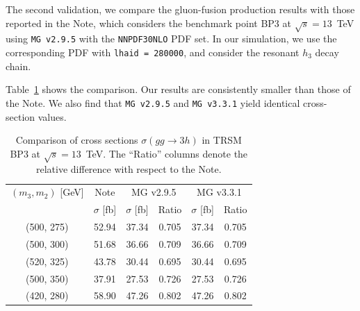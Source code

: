 \documentclass[12pt]{article}
\begin{document}
        The second validation, we compare the gluon-fusion production results with those reported in the Note, which considers the benchmark point BP3 at $\sqrt{s} = 13$~TeV using \verb|MG v2.9.5| with the \texttt{NNPDF30NLO} PDF set. In our simulation, we use the corresponding PDF with \texttt{lhaid = 280000}, and consider the resonant $h_3$ decay chain.  

        Table~\ref{tab:trsm_xs_comparison_13tev} shows the comparison. Our results are consistently smaller than those of the Note. We also find that \verb|MG v2.9.5| and \verb|MG v3.3.1| yield identical cross-section values.  
        \begin{table}[htpb]
            \centering
            \caption{Comparison of cross sections $\sigma(gg \to 3h)$ in TRSM BP3 at $\sqrt{s} = 13$~TeV. The ``Ratio'' columns denote the relative difference with respect to the Note.}
            \label{tab:trsm_xs_comparison_13tev}
            \begin{tabular}{c|c|cc|cc}
                $(m_3, m_2)$ [GeV] & Note & \multicolumn{2}{c|}{MG v2.9.5} & \multicolumn{2}{c}{MG v3.3.1} \\ \cline{2-6} 
                                   & $\sigma$ [fb] & $\sigma$ [fb] & Ratio & $\sigma$ [fb] & Ratio \\ \hline
                (500, 275) & 52.94 & 37.34 & 0.705 & 37.34 & 0.705 \\
                (500, 300) & 51.68 & 36.66 & 0.709 & 36.66 & 0.709 \\
                (520, 325) & 43.78 & 30.44 & 0.695 & 30.44 & 0.695 \\
                (500, 350) & 37.91 & 27.53 & 0.726 & 27.53 & 0.726 \\
                (420, 280) & 58.90 & 47.26 & 0.802 & 47.26 & 0.802
            \end{tabular}
        \end{table}
\end{document}
